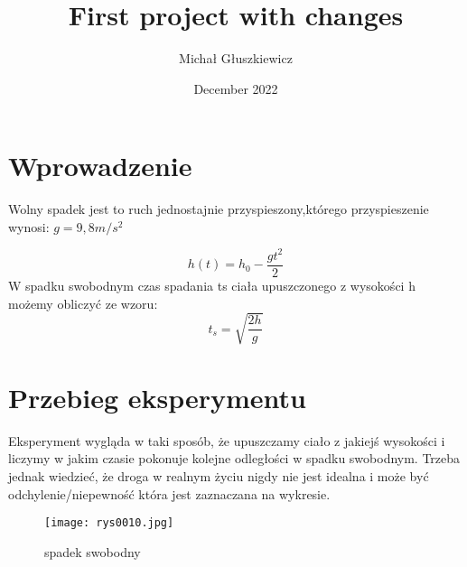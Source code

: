\documentclass{article}
\title{First project with changes}
\author{Michał Głuszkiewicz}
\date{December 2022}
\begin{document}
\maketitle
\section{Wprowadzenie}
\begin{center}
Wolny spadek jest to ruch jednostajnie przyspieszony,którego przyspieszenie wynosi: $g = 9,8m/s^2$
\end{center}
\begin{equation}
h(t)=h_0 - \frac{gt^2}{2}
\end{equation}
W spadku swobodnym czas spadania ts ciała upuszczonego z wysokości h możemy obliczyć ze wzoru:
\begin{equation}
    t_s= \sqrt{\frac{2h}{g}}
\end{equation}
\section{Przebieg eksperymentu}
Eksperyment wygląda w taki sposób, że upuszczamy ciało z jakiejś wysokości i liczymy w jakim czasie pokonuje kolejne odległości w spadku swobodnym. Trzeba jednak wiedzieć, że droga w realnym życiu nigdy nie jest idealna i może być odchylenie/niepewność która jest zaznaczana na wykresie.

\begin{figure}[h]
\texttt{[image: rys0010.jpg]}
\label{fig:schemat doswiadczenia}
\caption{spadek swobodny}
\end{figure}
\end{document}
